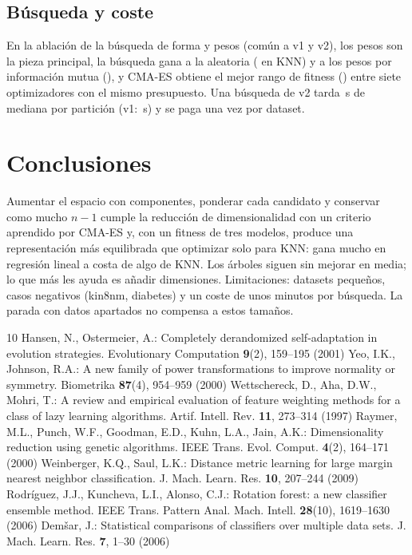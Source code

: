 \documentclass[runningheads]{llncs}
\begin{document}
\subsection{Búsqueda y coste}
En la ablación de la búsqueda de forma y pesos (común a v1 y v2), los pesos son la pieza principal, la búsqueda gana a
la aleatoria (\ctrlAleat{} en KNN) y a los pesos por información mutua (\ctrlMI), y CMA-ES obtiene el mejor rango de
fitness (\rangoCMA) entre siete optimizadores con el mismo presupuesto. Una búsqueda de v2 tarda \dosSegMediana\,s de
mediana por partición (v1: \segMediana\,s) y se paga una vez por dataset.

\section{Conclusiones}
Aumentar el espacio con componentes, ponderar cada candidato y conservar como mucho $n-1$ cumple la reducción de
dimensionalidad con un criterio aprendido por CMA-ES y, con un fitness de tres modelos, produce una representación más
equilibrada que optimizar solo para KNN: gana mucho en regresión lineal a costa de algo de KNN. Los árboles siguen sin
mejorar en media; lo que más les ayuda es añadir dimensiones. Limitaciones: datasets pequeños, casos negativos (kin8nm,
diabetes) y un coste de unos minutos por búsqueda. La parada con datos apartados no compensa a estos tamaños.

\begin{thebibliography}{10}
 Hansen, N., Ostermeier, A.: Completely derandomized self-adaptation in evolution strategies.
Evolutionary Computation \textbf{9}(2), 159--195 (2001)
 Yeo, I.K., Johnson, R.A.: A new family of power transformations to improve normality or symmetry.
Biometrika \textbf{87}(4), 954--959 (2000)
 Wettschereck, D., Aha, D.W., Mohri, T.: A review and empirical evaluation of feature
weighting methods for a class of lazy learning algorithms. Artif. Intell. Rev. \textbf{11}, 273--314 (1997)
 Raymer, M.L., Punch, W.F., Goodman, E.D., Kuhn, L.A., Jain, A.K.: Dimensionality reduction using
genetic algorithms. IEEE Trans. Evol. Comput. \textbf{4}(2), 164--171 (2000)
 Weinberger, K.Q., Saul, L.K.: Distance metric learning for large margin nearest neighbor
classification. J. Mach. Learn. Res. \textbf{10}, 207--244 (2009)
 Rodríguez, J.J., Kuncheva, L.I., Alonso, C.J.: Rotation forest: a new classifier ensemble
method. IEEE Trans. Pattern Anal. Mach. Intell. \textbf{28}(10), 1619--1630 (2006)
 Demšar, J.: Statistical comparisons of classifiers over multiple data sets. J. Mach. Learn.
Res. \textbf{7}, 1--30 (2006)
\end{thebibliography}
\end{document}
